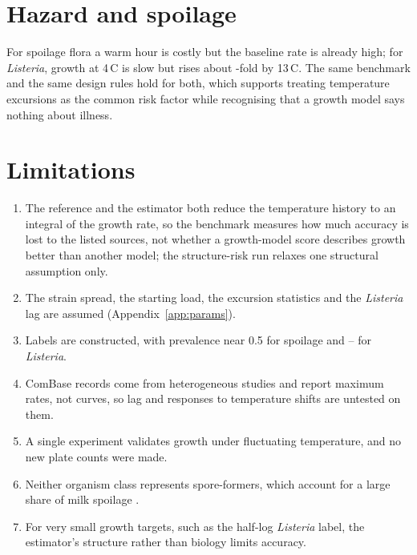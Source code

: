 \documentclass[11pt,a4paper,twoside,openany]{book}
\newcommand{\degC}{\,\textdegree C}
\theoremstyle{plain}\newtheorem{proposition}{Proposition}\newtheorem{corollary}{Corollary}
\theoremstyle{definition}\newtheorem{definition}{Definition}[chapter]
\begin{document}
\section{Hazard and spoilage}
For spoilage flora a warm hour is costly but the baseline rate is already high; for \textit{Listeria}, growth at 4\degC{} is slow but rises about \NumLisRatio-fold by 13\degC. The same benchmark and the same design rules hold for both, which supports treating temperature excursions as the common risk factor while recognising that a growth model says nothing about illness.

\section{Limitations}
\begin{enumerate}[label=(\roman*)]
\item The reference and the estimator both reduce the temperature history to an integral of the growth rate, so the benchmark measures how much accuracy is lost to the listed sources, not whether a growth-model score describes growth better than another model; the structure-risk run relaxes one structural assumption only.
\item The strain spread, the starting load, the excursion statistics and the \textit{Listeria} lag are assumed (Appendix~\ref{app:params}).
\item Labels are constructed, with prevalence near 0.5 for spoilage and \NumLisPrevMin--\NumLisPrevMax{} for \textit{Listeria}.
\item ComBase records come from heterogeneous studies and report maximum rates, not curves, so lag and responses to temperature shifts are untested on them.
\item A single experiment validates growth under fluctuating temperature, and no new plate counts were made.
\item Neither organism class represents spore-formers, which account for a large share of milk spoilage \cite{martin2021}.
\item For very small growth targets, such as the half-log \textit{Listeria} label, the estimator's structure rather than biology limits accuracy.
\end{enumerate}

\end{document}
